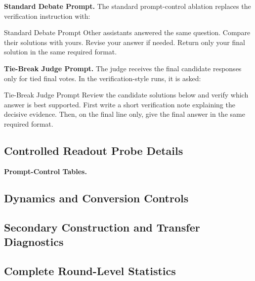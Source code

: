 \documentclass{article}
\begin{document}
\textbf{Standard Debate Prompt.}
\label{app:prompt_standard_debate}
The standard prompt-control ablation replaces the verification instruction with:
\begin{promptbox}{Standard Debate Prompt}
\small
Other assistants answered the same question. Compare their solutions with
yours. Revise your answer if needed. Return only your final solution in the same
required format.
\end{promptbox}

\textbf{Tie-Break Judge Prompt.}
\label{app:prompt_tiebreak_judge}
The judge receives the final candidate responses only for tied final votes. In
the verification-style runs, it is asked:
\begin{promptbox}{Tie-Break Judge Prompt}
\small
Review the candidate solutions below and verify which answer is best
supported. First write a short verification note explaining the decisive
evidence. Then, on the final line only, give the final answer in the same
required format.
\end{promptbox}

\clearpage
\subsection{Controlled Readout Probe Details}
\label{app:controlled_readout_probes}

\clearpage

\textbf{Prompt-Control Tables.}
\label{app:prompt_control_tables}


\clearpage
\subsection{Dynamics and Conversion Controls}
\label{app:dynamics_conversion_controls}


\clearpage
\subsection{Secondary Construction and Transfer Diagnostics}
\label{app:secondary_construction_diagnostics}


\clearpage
\subsection{Complete Round-Level Statistics}
\label{app:round_level_statistics}
\end{document}
